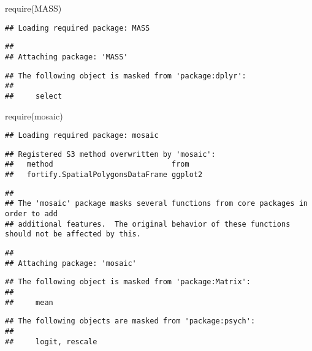 \documentclass[
]{book}
\newenvironment{Shaded}{\begin{snugshade}}{\end{snugshade}}
\newcommand{\FunctionTok}[1]{\textcolor[rgb]{0.00,0.00,0.00}{#1}}
\newcommand{\NormalTok}[1]{#1}
\begin{document}
\begin{Shaded}
\begin{Highlighting}[]
\FunctionTok{require}\NormalTok{(MASS)}
\end{Highlighting}
\end{Shaded}

\begin{verbatim}
## Loading required package: MASS
\end{verbatim}

\begin{verbatim}
## 
## Attaching package: 'MASS'
\end{verbatim}

\begin{verbatim}
## The following object is masked from 'package:dplyr':
## 
##     select
\end{verbatim}

\begin{Shaded}
\begin{Highlighting}[]
\FunctionTok{require}\NormalTok{(mosaic)}
\end{Highlighting}
\end{Shaded}

\begin{verbatim}
## Loading required package: mosaic
\end{verbatim}

\begin{verbatim}
## Registered S3 method overwritten by 'mosaic':
##   method                           from   
##   fortify.SpatialPolygonsDataFrame ggplot2
\end{verbatim}

\begin{verbatim}
## 
## The 'mosaic' package masks several functions from core packages in order to add 
## additional features.  The original behavior of these functions should not be affected by this.
\end{verbatim}

\begin{verbatim}
## 
## Attaching package: 'mosaic'
\end{verbatim}

\begin{verbatim}
## The following object is masked from 'package:Matrix':
## 
##     mean
\end{verbatim}

\begin{verbatim}
## The following objects are masked from 'package:psych':
## 
##     logit, rescale
\end{verbatim}
\end{document}
